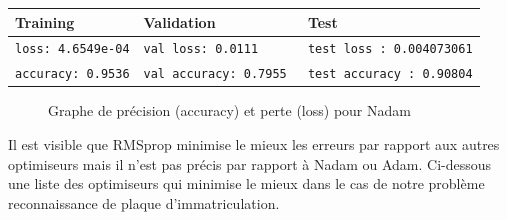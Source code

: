 		\begin{table}[H]
			\centering
			\begin{tabular}{l|l|l}
				\hline
				\textbf{Training} & \textbf{Validation} & \textbf{Test} \\
				\hline
				\texttt{loss: 4.6549e-04} & \texttt{val loss: 0.0111} & \texttt{test loss : 0.004073061} \\
				\texttt{accuracy: 0.9536} & \texttt{val accuracy: 0.7955 }& \texttt{test accuracy : 0.90804}\\
				
				\hline 
				
			\end{tabular}
		\end{table}
	
		\begin{figure}[H]
			\myfloatalign
			 \quad
			
			\caption[]{Graphe de précision (accuracy) et perte (loss)  pour Nadam}
		\end{figure}
	
	
	
	 Il est visible que RMSprop minimise le mieux les erreurs par rapport aux autres optimiseurs mais il n’est pas précis par rapport à Nadam ou Adam. Ci-dessous une liste des optimiseurs qui minimise le mieux dans le cas de notre problème reconnaissance de plaque d’immatriculation.
	
